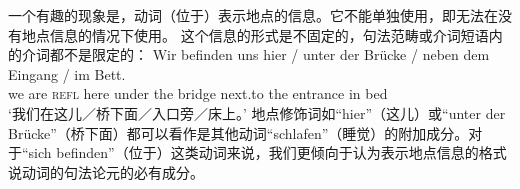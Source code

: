 一个有趣的现象是，动词（位于）表示地点的信息。它不能单独使用，即无法在没有地点信息的情况下使用。
\z
这个信息的形式是不固定的，句法范畴或介词短语内的介词都不是限定的：
\ea
\gll Wir befinden uns hier / unter der Brücke / neben dem Eingang / im Bett.\\
	 we are \textsc{refl} here {} under the bridge {} next.to the entrance {} in bed\\
\glt `我们在这儿／桥下面／入口旁／床上。'
\z
地点修饰词如“hier”（这儿）或“unter der Brücke”（桥下面）都可以看作是其他动词“schlafen”（睡觉）的附加成分。对于“sich befinden”（位于）这类动词来说，我们更倾向于认为表示地点信息的格式说动词的句法论元的必有成分。
%
%
